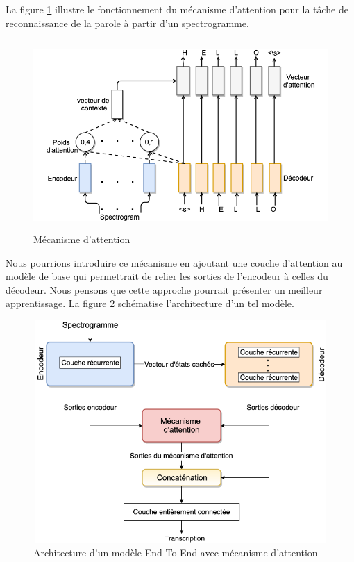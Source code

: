 La figure \ref{atn} illustre le fonctionnement du mécanisme d'attention pour la tâche de reconnaissance de la parole à partir d'un spectrogramme.

\begin{figure}[H]
    \centering
    \includegraphics[height=205pt,width=365pt]{images/chap3/Att.png}
    \caption{Mécanisme d'attention}
    \label{atn}
\end{figure}

Nous pourrions introduire ce mécanisme en ajoutant une couche d'attention au modèle de base qui permettrait de relier les sorties de l'encodeur à celles du décodeur. Nous pensons que cette approche pourrait présenter un meilleur apprentissage. La figure \ref{archi_atn} schématise l'architecture d'un tel modèle.

\begin{figure}[H]
    \centering
    \includegraphics[width=320pt, height=240pt]{images/chap3/Attention.png}
    \caption{Architecture d'un modèle End-To-End avec mécanisme d'attention}
    \label{archi_atn}
\end{figure}

